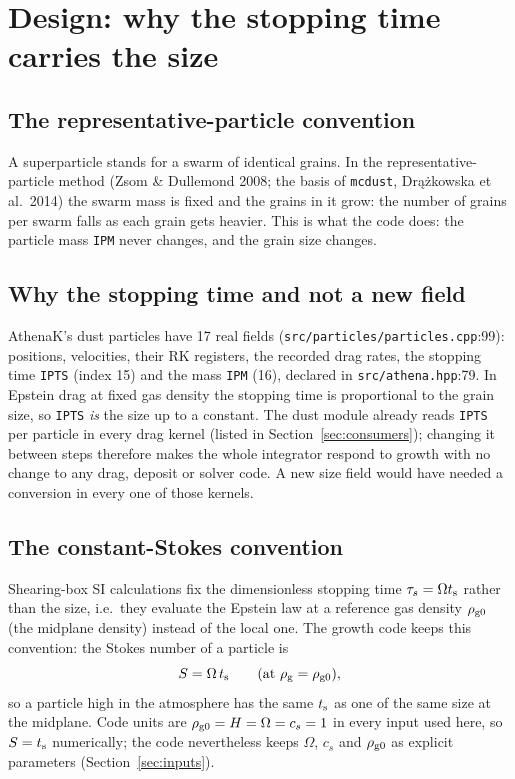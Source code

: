 \documentclass[11pt]{article}
\newcommand{\code}[1]{\texttt{#1}}
\newcommand{\file}[1]{\texttt{\small #1}}
\newcommand{\St}{S}
\newcommand{\ts}{t_{\rm s}}
\newcommand{\rhog}{\rho_{\rm g}}
\begin{document}
\section{Design: why the stopping time carries the size}\label{sec:design}

\subsection{The representative-particle convention}
A superparticle stands for a swarm of identical grains. In the representative-particle
method (Zsom \& Dullemond 2008; the basis of \code{mcdust}, Dr\k{a}\.zkowska et al.\
2014) the swarm mass is fixed and the grains in it grow: the number of grains per swarm
falls as each grain gets heavier. This is what the code does: the particle mass
\code{IPM} never changes, and the grain size changes.

\subsection{Why the stopping time and not a new field}
AthenaK's dust particles have 17 real fields (\file{src/particles/particles.cpp}:99):
positions, velocities, their RK registers, the recorded drag rates, the stopping time
\code{IPTS} (index 15) and the mass \code{IPM} (16), declared in
\file{src/athena.hpp}:79. In Epstein drag at fixed gas density the stopping time is
proportional to the grain size, so \code{IPTS} \emph{is} the size up to a constant. The
dust module already reads \code{IPTS} per particle in every drag kernel (listed in
Section~\ref{sec:consumers}); changing it between steps therefore makes the whole
integrator respond to growth with no change to any drag, deposit or solver code. A new
size field would have needed a conversion in every one of those kernels.

\subsection{The constant-Stokes convention}
Shearing-box SI calculations fix the dimensionless stopping time $\tau_s=\Omega\ts$
rather than the size, i.e.\ they evaluate the Epstein law at a reference gas density
$\rho_{\rm g0}$ (the midplane density) instead of the local one. The growth code keeps this
convention: the Stokes number of a particle is
\begin{equation}
  \St = \Omega\,\ts \qquad\text{(at } \rhog=\rho_{\rm g0}\text{)},
\end{equation}
so a particle high in the atmosphere has the same $\ts$ as one of the same size at the
midplane. Code units are $\rho_{\rm g0}=H=\Omega=c_s=1$ in every input used here, so
$\St=\ts$ numerically; the code nevertheless keeps $\Omega$, $c_s$ and $\rho_{\rm g0}$ as
explicit parameters (Section~\ref{sec:inputs}).
\end{document}
